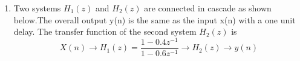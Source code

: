\documentclass[journal,12pt,twocolumn]{IEEEtran}
\begin{document}
\begin{enumerate}
%
%

%

%

\item Two systems $H_1(z)$ and $H_2(z)$ are connected in cascade as shown below.The overall output y(n) is the same as the input x(n) with a one unit delay. The transfer function of the second system $H_2(z)$ is\\
{\small
\begin{equation*}
X(n) \longrightarrow \boxed{H_1(z) = \frac{1-0.4z^{-1}}{1-0.6 z^{-1}}}\longrightarrow \boxed{H_2(z)} \longrightarrow y(n)
\end{equation*}  
}


\end{enumerate}
\end{document}
